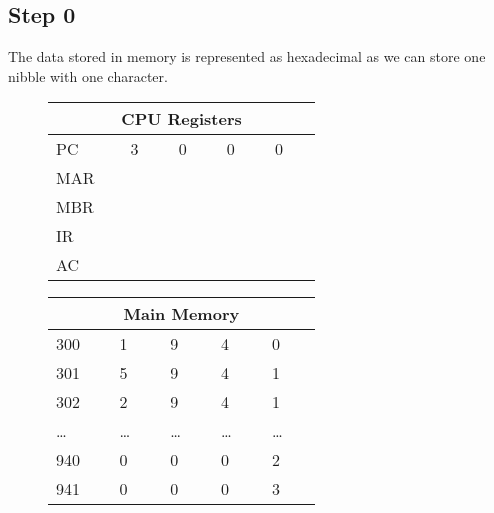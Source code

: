 \subsection*{Step 0}
The data stored in memory is represented as hexadecimal as we can store one nibble with one character.
\begin{figure}[H]
    \begin{minipage}[t]{0.45\textwidth}
        \centering
        \begin{tabular}[H]{p{0.15\linewidth} p{0.12\linewidth} p{0.12\linewidth} p{0.12\linewidth} p{0.12\linewidth}}
            \multicolumn{5}{c}{\textbf{CPU Registers}}\\
            \hline
            \hline
            PC & 3 & 0 & 0 & 0 \\
            \hline
            MAR &  &  &  &  \\
            \hline
            MBR &  &  &  &  \\
            \hline
            IR &  &  &  &  \\
            \hline
            AC &  &  &  &  \\
            \hline
        \end{tabular}
    \end{minipage}\hfill
    \begin{minipage}[t]{0.45\textwidth}
        \centering
        \begin{tabular}[H]{p{0.15\linewidth} p{0.12\linewidth} p{0.12\linewidth} p{0.12\linewidth} p{0.12\linewidth}}
            \multicolumn{5}{c}{\textbf{Main Memory}}\\
            \hline
            \hline
            300 & 1 & 9 & 4 & 0 \\
            \hline
            301 & 5 & 9 & 4 & 1 \\
            \hline
            302 & 2 & 9 & 4 & 1 \\
            \hline
            \ldots & \ldots & \ldots & \ldots & \ldots \\
            \hline
            940 & 0 & 0 & 0 & 2 \\
            \hline
            941 & 0 & 0 & 0 & 3 \\
            \hline
        \end{tabular}
    \end{minipage}\hfill
\end{figure}

